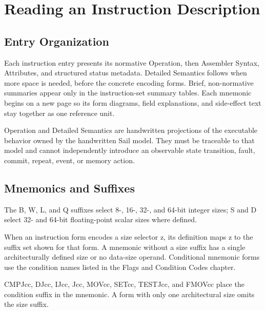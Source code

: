 \clearpage
\begingroup
\setlength{\parskip}{1pt}
\titlespacing*{\section}{0pt}{0.8em}{0.45em}
\titlespacing*{\subsection}{0pt}{0.45em}{0.25em}
\section*{Reading an Instruction Description}\label{page:reading-an-instruction-description}
{}
\subsection*{Entry Organization}
Each instruction entry presents its normative Operation, then Assembler Syntax, Attributes, and structured status
metadata. Detailed Semantics follows when more space is needed, before the concrete encoding forms. Brief,
non-normative summaries appear only in the instruction-set summary tables. Each mnemonic begins on a new page so its
form diagrams, field explanations, and side-effect text stay together as one reference unit.

Operation and Detailed Semantics are handwritten projections of the executable behavior owned by the handwritten
Sail model. They must be traceable to that model and cannot independently introduce an observable state transition,
fault, commit, repeat, event, or memory action.

\subsection*{Mnemonics and Suffixes}
The B, W, L, and Q suffixes select 8-, 16-, 32-, and 64-bit integer sizes; S and D select 32- and 64-bit
floating-point scalar sizes where defined.

When an instruction form encodes a size selector z, its definition maps z to the suffix set shown for that form. A
mnemonic without a size suffix has a single architecturally defined size or no data-size operand.
Conditional mnemonic forms use the condition names listed in the Flags and Condition Codes chapter.

CMPJcc, DJcc, IJcc, Jcc, MOVcc, SETcc, TESTJcc, and FMOVcc place the condition suffix in the mnemonic. A form with
only one architectural size omits the size suffix.

